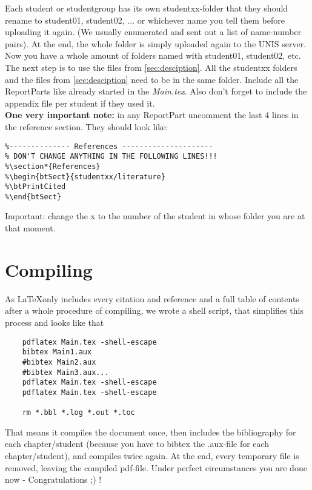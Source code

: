 \documentclass[12pt,a4paper,notitlepage]{scrreprt}
\begin{document}
Each student or studentgroup has its own studentxx-folder that they should rename to student01, student02, ... or whichever name you tell them before uploading it again. (We usually enumerated and sent out a list of name-number pairs). At the end, the whole folder is simply uploaded again to the UNIS server. Now you have a whole amount of folders named with student01, student02, etc. The next step is to use the files from \autoref{sec:desciption}. All the studentxx folders and the files from \autoref{sec:desciption} need to be in the same folder. Include all the ReportParts like already started in the \textit{Main.tex}. Also don't forget to include the appendix file per student if they used it.\\

\textbf{One very important note:} in any ReportPart uncomment the last 4 lines in the reference section. They should look like:
\begin{verbatim}
%-------------- References ---------------------
% DON'T CHANGE ANYTHING IN THE FOLLOWING LINES!!!
%\section*{References}
%\begin{btSect}{studentxx/literature}
%\btPrintCited
%\end{btSect}
\end{verbatim}
Important: change the x to the number of the student in whose folder you are at that moment.

\section{Compiling}

As \LaTeX only includes every citation and reference and a full table of contents after a whole procedure of compiling, we wrote a shell script, that simplifies this process and looks like that

\begin{verbatim}
	pdflatex Main.tex -shell-escape
	bibtex Main1.aux
	#bibtex Main2.aux
	#bibtex Main3.aux...
	pdflatex Main.tex -shell-escape
	pdflatex Main.tex -shell-escape

	rm *.bbl *.log *.out *.toc
\end{verbatim}

That means it compiles the document once, then includes the bibliography for each chapter/student (because you have to bibtex the .aux-file for each chapter/student), and compiles twice again. At the end, every temporary file is removed, leaving the compiled pdf-file. Under perfect circumstances you are done now - Congratulations ;) !
\end{document}
